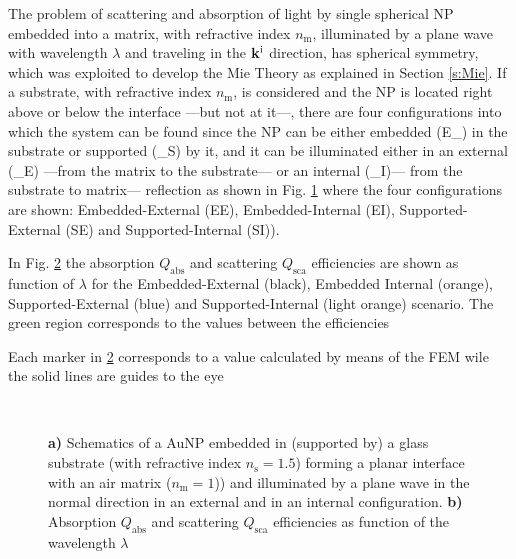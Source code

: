 
The problem of scattering and absorption of light by single spherical NP embedded into a matrix, with refractive index $n_\text{m}$, illuminated by a plane wave with wavelength $\lambda$  and traveling in the  $\vb{k}^\text{i}$ direction, has spherical symmetry, which was exploited to develop the Mie Theory as explained in Section \ref{s:Mie}. If a substrate, with refractive index $n_\text{m}$, is considered and the NP is located right above or below the interface ---but not at it---, there are four configurations into which the system can be found since the NP can be either embedded (E\_) in the substrate or supported (\_S) by it, and it can be illuminated either in an external (\_E) ---from the matrix to the substrate--- or an internal (\_I)--- from the substrate to matrix--- reflection as shown in Fig. \ref{sfig:TotallyNormal:1} where the four configurations are shown: Embedded-External (EE), Embedded-Internal (EI), Supported-External (SE) and Supported-Internal (SI)).

In Fig. \ref{sfig:TotallyNormal:2} the absorption $Q_\text{abs}$ and scattering $Q_\text{sca}$ efficiencies are shown as function of $\lambda$ for the Embedded-External (black), Embedded Internal (orange), Supported-External (blue) and Supported-Internal (light orange) scenario. The green region corresponds to the values between the efficiencies 

Each marker in \ref{sfig:TotallyNormal:2} corresponds to a value calculated by means of the FEM wile the solid lines are guides to the eye


\begin{figure}[h!]
    \hspace*{-19.15em}%
    \vspace*{-1.25em}%
        \begin{subfigure}{.385\textwidth}\caption{ }\label{sfig:TotallyNormal:1}\end{subfigure}%
        \begin{subfigure}{.25\textwidth}\caption{ }\label{sfig:TotallyNormal:2}\end{subfigure} \\
    \def\svgwidth{.95\textwidth}
    \small
    \centering
    \vspace*{0em}
    \caption[Absorption and Scattering Efficiencies of a 12.5 nm AuNP above and below a lanar Interface Illuminated at Normal Incidence]{\textbf{a)} Schematics of a AuNP embedded in (supported by) a glass substrate (with refractive index $n_\text{s} = 1.5$) forming a planar interface with an air matrix ($n_\text{m} = 1$)) and illuminated by a plane wave in the normal direction in an external and in an internal configuration. \textbf{b)} Absorption $Q_\text{abs}$ and scattering $Q_\text{sca}$ efficiencies as function of the wavelength $\lambda$
    }
\label{fig:TotallyNormal}
\end{figure}



